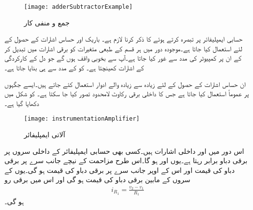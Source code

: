 %
\begin{figure}
\centering
\texttt{[image: adderSubtractorExample]}
\caption{جمع و منفی کار}
\label{شکل_جمع_و_منفی_کار}
\end{figure}


حسابی ایمپلیفائر پر تبصرہ کرتے ہوئے  کا ذکر کرنا لازم ہے۔ باریک اور حساس اشارات کے حصول کے لئے استعمال کیا جاتا ہے۔موجودہ دور میں ہر قسم کے طبعی متغیرات کو برقی اشارات میں تبدیل کر کے ان پر کمپیوٹر کی مدد سے غور کیا جاتا ہے۔آپ  سے بخوبی واقف ہوں گے جو دل کے کارکردگی کے اشارات کھینچتا ہے۔ کو  کے مدد سے ہی بنایا جاتا ہے۔

ان حساس اشارات کے حصول کے لئے زیادہ سے زیادہ   والے ادوار استعمال کئے جاتے ہیں۔ایسے جگہوں پر عموماً  استعمال کیا جاتا ہے جس کا داخلی برقی رکاوٹ لامحدود تصور کیا جا سکتا ہے۔  کو شکل  میں دکھایا گیا ہے۔
\begin{figure} \label{شکل_حسابی_آلاتی_ایمپلیفائر}
\centering
\texttt{[image: instrumentationAmplifier]}
\caption{آلاتی ایمپلیفائر}
\label{شکل_آلاتی_ایمپلیفائر}
\end{figure}
اس دور میں   اور  داخلی اشارات ہیں۔کسی بھی حسابی ایمپلیفائر کے داخلی سروں پر برقی دباو برابر رہتا ہے۔یوں  اور   ہو گا۔اس طرح مزاحمت  کے نیچے جانب سرے پر برقی دباو کی قیمت  اور اس کے اوپر جانب سرے پر برقی دباو کی قیمت  ہو گی۔یوں  کے سروں کے مابین برقی دباو کی قیمت  ہو گی اور اس میں برقی رو
\begin{align}
i_{R_1}=\frac{v_2-v_1}{R_1}
\end{align}
ہو گی۔


